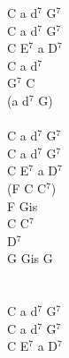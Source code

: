 \documentclass[a5paper, 10pt]{book}
\begin{document}
\begin{minipage}[t]{0.3\textwidth}
C a d$^7$ G$^7$\\
C a d$^7$ G$^7$\\
C E$^7$ a D$^7$\\

\hspace*{4mm}C a d$^7$\\
\hspace*{4mm}G$^7$ C\\
(a d$^7$ G)\\
\\
C a d$^7$ G$^7$\\
C a d$^7$ G$^7$\\
C E$^7$ a D$^7$\\

(F C C$^7$)\\
F Gis\\
C C$^7$\\
D$^7$\\
G Gis G\\
\\
\\
C a d$^7$ G$^7$\\
C a d$^7$ G$^7$\\
C E$^7$ a D$^7$\\

\end{minipage}

\newpage
\end{document}
